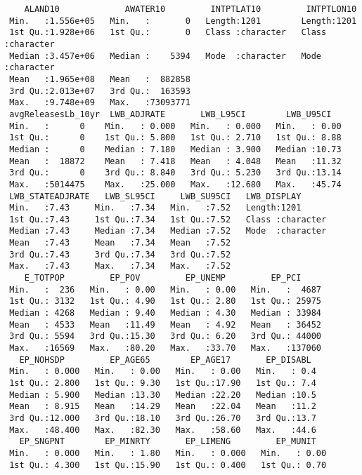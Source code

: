 \documentclass[
  12pt,
]{article}
\begin{document}
\begin{verbatim}
    ALAND10             AWATER10         INTPTLAT10         INTPTLON10       
 Min.   :1.556e+05   Min.   :       0   Length:1201        Length:1201       
 1st Qu.:1.928e+06   1st Qu.:       0   Class :character   Class :character  
 Median :3.457e+06   Median :    5394   Mode  :character   Mode  :character  
 Mean   :1.965e+08   Mean   :  882858                                        
 3rd Qu.:2.013e+07   3rd Qu.:  163593                                        
 Max.   :9.748e+09   Max.   :73093771                                        
 avgReleasesLb_10yr  LWB_ADJRATE       LWB_L95CI        LWB_U95CI    
 Min.   :      0    Min.   : 0.000   Min.   : 0.000   Min.   : 0.00  
 1st Qu.:      0    1st Qu.: 5.800   1st Qu.: 2.710   1st Qu.: 8.88  
 Median :      0    Median : 7.180   Median : 3.900   Median :10.73  
 Mean   :  18872    Mean   : 7.418   Mean   : 4.048   Mean   :11.32  
 3rd Qu.:      0    3rd Qu.: 8.840   3rd Qu.: 5.230   3rd Qu.:13.14  
 Max.   :5014475    Max.   :25.000   Max.   :12.680   Max.   :45.74  
 LWB_STATEADJRATE   LWB_SL95CI     LWB_SU95CI   LWB_DISPLAY       
 Min.   :7.43     Min.   :7.34   Min.   :7.52   Length:1201       
 1st Qu.:7.43     1st Qu.:7.34   1st Qu.:7.52   Class :character  
 Median :7.43     Median :7.34   Median :7.52   Mode  :character  
 Mean   :7.43     Mean   :7.34   Mean   :7.52                     
 3rd Qu.:7.43     3rd Qu.:7.34   3rd Qu.:7.52                     
 Max.   :7.43     Max.   :7.34   Max.   :7.52                     
    E_TOTPOP         EP_POV         EP_UNEMP         EP_PCI      
 Min.   :  236   Min.   : 0.00   Min.   : 0.00   Min.   :  4687  
 1st Qu.: 3132   1st Qu.: 4.90   1st Qu.: 2.80   1st Qu.: 25975  
 Median : 4268   Median : 9.40   Median : 4.30   Median : 33984  
 Mean   : 4533   Mean   :11.49   Mean   : 4.92   Mean   : 36452  
 3rd Qu.: 5594   3rd Qu.:15.30   3rd Qu.: 6.20   3rd Qu.: 44000  
 Max.   :16569   Max.   :80.20   Max.   :33.70   Max.   :137060  
   EP_NOHSDP         EP_AGE65        EP_AGE17       EP_DISABL   
 Min.   : 0.000   Min.   : 0.00   Min.   : 0.00   Min.   : 0.4  
 1st Qu.: 2.800   1st Qu.: 9.30   1st Qu.:17.90   1st Qu.: 7.4  
 Median : 5.900   Median :13.30   Median :22.20   Median :10.5  
 Mean   : 8.915   Mean   :14.29   Mean   :22.04   Mean   :11.2  
 3rd Qu.:12.000   3rd Qu.:18.10   3rd Qu.:26.70   3rd Qu.:13.7  
 Max.   :48.400   Max.   :82.30   Max.   :58.60   Max.   :44.6  
   EP_SNGPNT        EP_MINRTY       EP_LIMENG         EP_MUNIT    
 Min.   : 0.000   Min.   : 1.80   Min.   : 0.000   Min.   : 0.00  
 1st Qu.: 4.300   1st Qu.:15.90   1st Qu.: 0.400   1st Qu.: 0.70  

\end{verbatim}
\end{document}
